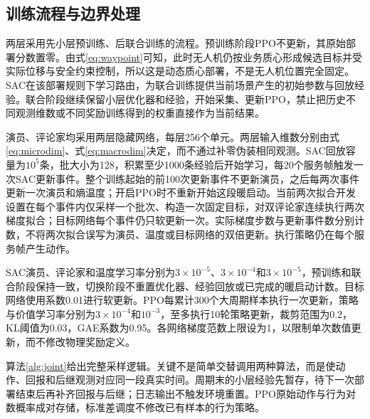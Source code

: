 \subsection{训练流程与边界处理}
两层采用先小层预训练、后联合训练的流程。预训练阶段PPO不更新，其原始部署分数置零。由式\eqref{eq:waypoint}可知，此时无人机仍按业务质心形成候选目标并受实际位移与安全约束控制，所以这是动态质心部署，不是无人机位置完全固定。SAC在该部署规则下学习路由，为联合训练提供当前场景产生的初始参数与回放经验。联合阶段继续保留小层优化器和经验，开始采集、更新PPO，禁止把历史不同观测维数或不同奖励训练得到的权重直接作为当前结果。

演员、评论家均采用两层隐藏网络，每层256个单元。两层输入维数分别由式\eqref{eq:microdim}、式\eqref{eq:macrodim}决定，而不通过补零伪装相同观测。SAC回放容量为$10^5$条，批大小为128，积累至少1000条经验后开始学习，每20个服务帧触发一次SAC更新事件。整个训练起始的前100次更新事件不更新演员，之后每两次事件更新一次演员和熵温度；开启PPO时不重新开始这段暖启动。当前两次拟合开发设置在每个事件内仅采样一个批次、构造一次固定目标，对双评论家连续执行两次梯度拟合；目标网络每个事件仍只软更新一次。实际梯度步数与更新事件数分别计数，不将两次拟合误写为演员、温度或目标网络的双倍更新。执行策略仍在每个服务帧产生动作。

SAC演员、评论家和温度学习率分别为$3\times10^{-5}$、$3\times10^{-4}$和$3\times10^{-5}$，预训练和联合阶段保持一致，切换阶段不重置优化器、经验回放或已完成的暖启动计数。目标网络使用系数0.01进行软更新。PPO每累计300个大周期样本执行一次更新，策略与价值学习率分别为$3\times10^{-4}$和$10^{-3}$，至多执行10轮策略更新，裁剪范围为0.2，KL阈值为0.03，GAE系数为0.95。各网络梯度范数上限设为1，以限制单次数值更新，而不修改物理奖励定义。

算法\ref{alg:joint}给出完整采样逻辑。关键不是简单交替调用两种算法，而是使动作、回报和后继观测对应同一段真实时间。周期末的小层经验先暂存，待下一次部署结束后再补齐回报与后继；日志输出不触发环境重置。PPO原始动作与行为对数概率成对存储，标准差调度不修改已有样本的行为策略。

